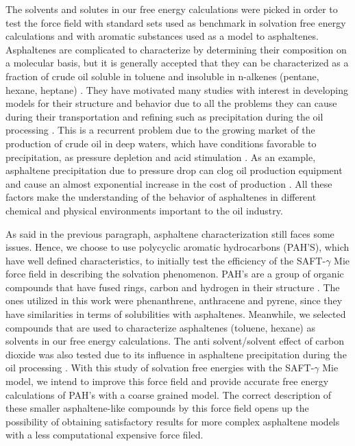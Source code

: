 The solvents and solutes in our free energy calculations were picked in order to test the force field with standard sets used as benchmark in solvation free energy calculations and with aromatic substances used as a model to asphaltenes. Asphaltenes are complicated to characterize by determining their composition on a molecular basis, but it is generally accepted that they can be characterized as a fraction of crude oil soluble in toluene and insoluble in n-alkenes (pentane, hexane, heptane) \cite{SJOBLOM2003399}. They have motivated many studies with interest in developing models for their structure and behavior due to all the problems they can cause during their transportation and refining such as precipitation  during the oil processing \cite{SJOBLOM20151}. This is a recurrent problem due to the growing market of the production of crude oil in deep waters, which have conditions favorable to precipitation, as pressure depletion and  acid stimulation \cite{AIC:AIC10243}. As an example, asphaltene precipitation due to pressure drop can clog oil production equipment and cause an almost exponential increase in the cost of production \cite{AIC:AIC10243,doi:10.1021/ef010047l}. All these factors make the understanding of the behavior of asphaltenes in different chemical and physical environments important to the oil industry. 

As said in the previous paragraph, asphaltene characterization still faces some issues. Hence, we choose to use polycyclic aromatic hydrocarbons (PAH'S), which have well defined characteristics, to initially test the efficiency of the SAFT-$\gamma$ Mie force field in describing the solvation phenomenon. PAH's are a group of organic compounds that have fused rings, carbon and hydrogen in their structure \cite{RAVINDRA20082895}. The ones utilized in this work were phenanthrene, anthracene and pyrene, since they have  similarities in terms of solubilities with asphaltenes. Meanwhile,  we selected compounds that are used to characterize asphaltenes (toluene, hexane) as solvents in our free energy calculations. The anti solvent/solvent effect of carbon dioxide was also tested due to its influence in asphaltene precipitation during the oil processing \cite{SOROUSH2014405}. With this study of solvation free energies with the SAFT-$\gamma$ Mie model, we intend to improve this force field and provide accurate free energy calculations of PAH's with a coarse grained model. The correct description of these smaller asphaltene-like compounds by this force field opens up the possibility of obtaining satisfactory results for more complex asphaltene models with a less computational expensive force filed.

 